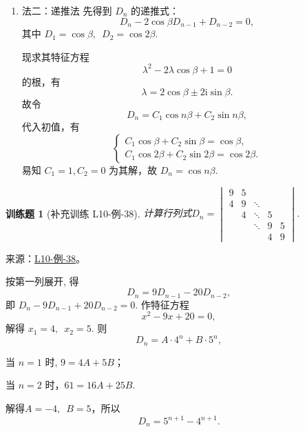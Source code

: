 \documentclass[12pt,fontset=fandol]{ctexart}
\newtheorem{exercise}{训练题}[section]
\begin{document}
\begin{solve}
\begin{enumerate}
            则证得$D_n=\cos n\beta,\enspace n\in \mathbf{N}$.

        \item 法二：递推法
            先得到 $D_n$ 的递推式：
            \[
                D_n - 2 \cos \beta D_{n-1} + D_{n-2} = 0,
            \]
            其中 $D_1 = \cos \beta, \enspace D_2 = \cos 2\beta$.

            现求其特征方程
            \[
                \lambda^2 - 2 \lambda \cos \beta + 1 = 0
            \]
            的根，有
            \[
                \lambda = 2 \cos \beta \pm 2 \mathrm{i} \sin \beta.
            \]
            故令
            \[
                D_n = C_1 \cos n\beta + C_2 \sin n\beta,
            \]
            代入初值，有
            \[
                \begin{cases}
                    C_1 \cos \beta + C_2 \sin \beta = \cos \beta, \\
                    C_1 \cos 2\beta + C_2 \sin 2\beta = \cos 2\beta.
                \end{cases}
            \]
            易知 $C_1 = 1, C_2 = 0$ 为其解，故 $D_n = \cos n\beta$.
    \end{enumerate}
\end{solve}

\begin{exercise}[补充训练 L10-例-38]\label{prob:L10-例-38}
计算行列式$D_n=
        \begin{vmatrix}
            9 & 5 &        &   &   \\
            4 & 9 & \ddots &   &   \\
              & 4 & \ddots & 5 &   \\
              &   & \ddots & 9 & 5 \\
              &   &        & 4 & 9
        \end{vmatrix}$.
\end{exercise}
\noindent 来源：\href{https://github.com/yhwu-is/Linear-Algebra-Left-Undone/blob/new/%E8%AE%B2%E4%B9%89/%E4%B8%93%E9%A2%98/10%20%E8%A1%8C%E5%88%97%E5%BC%8F.tex}{L10-例-38}。
\begin{solve}
按第一列展开, 得
    \[ D_n=9 D_{n-1}-20 D_{n-2}, \]
    即 $ D_n-9 D_{n-1}+20 D_{n-2}=0 $.
    作特征方程
    \[ x^{2}-9 x+20=0, \]
    解得 $ x_1=4,\enspace x_2=5 $. 则
    \[ D_n=A \cdot 4^n+B \cdot 5^n, \]

    当 $n=1$ 时, $9=4A+5B$；

    当 $n=2$ 时，$61=16A+25B$.

    解得$A=-4,\enspace B=5$，所以
    \[ D_n=5^{n+1}-4^{n+1}. \]
\end{solve}
\end{document}
